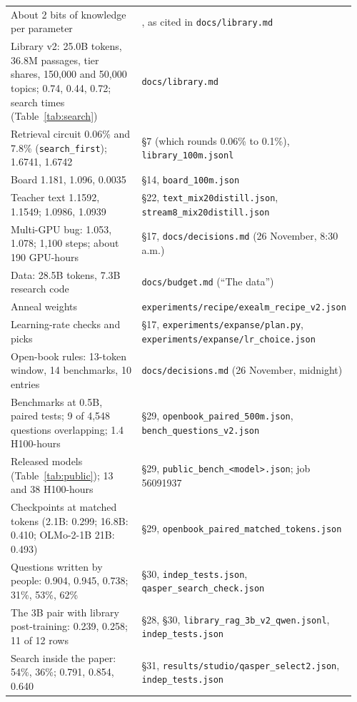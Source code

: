 \documentclass[10pt,twocolumn,letterpaper]{article}
\newcommand{\sect}[1]{\S#1}
\begin{document}
\begin{longtable}{@{}>{\raggedright\arraybackslash}p{0.56\linewidth} >{\raggedright\arraybackslash}p{0.40\linewidth}@{}}
About 2 bits of knowledge per parameter & \citet{allenzhu2024physics}, as cited in \texttt{docs/library.md} \\
Library v2: 25.0B tokens, 36.8M passages, tier shares, 150,000 and 50,000 topics; 0.74, 0.44, 0.72; search times (Table~\ref{tab:search}) & \texttt{docs/library.md} \\
Retrieval circuit 0.06\% and 7.8\% (\texttt{search\_first}); 1.6741, 1.6742 & \sect{7} (which rounds 0.06\% to 0.1\%), \texttt{library\_100m.jsonl} \\
Board 1.181, 1.096, 0.0035 & \sect{14}, \texttt{board\_100m.json} \\
Teacher text 1.1592, 1.1549; 1.0986, 1.0939 & \sect{22}, \texttt{text\_mix20distill.json}, \texttt{stream8\_mix20distill.json} \\
Multi-GPU bug: 1.053, 1.078; 1,100 steps; about 190 GPU-hours & \sect{17}, \texttt{docs/decisions.md} (26 November, 8:30 a.m.) \\
Data: 28.5B tokens, 7.3B research code & \texttt{docs/budget.md} (``The data'') \\
Anneal weights & \texttt{experiments/recipe/}\allowbreak\texttt{exealm\_recipe\_v2.json} \\
Learning-rate checks and picks & \sect{17}, \texttt{experiments/expanse/plan.py}, \texttt{experiments/expanse/lr\_choice.json} \\
Open-book rules: 13-token window, 14 benchmarks, 10 entries & \texttt{docs/decisions.md} (26 November, midnight) \\
Benchmarks at 0.5B, paired tests; 9 of 4,548 questions overlapping; 1.4 H100-hours & \sect{29}, \texttt{openbook\_paired\_500m.json}, \texttt{bench\_questions\_v2.json} \\
Released models (Table~\ref{tab:public}); 13 and 38 H100-hours & \sect{29}, \texttt{public\_bench\_<model>.json}; job 56091937 \\
Checkpoints at matched tokens (2.1B: 0.299; 16.8B: 0.410; OLMo-2-1B 21B: 0.493) & \sect{29}, \texttt{openbook\_paired\_matched\_tokens.json} \\
Questions written by people: 0.904, 0.945, 0.738; 31\%, 53\%, 62\% & \sect{30}, \texttt{indep\_tests.json}, \texttt{qasper\_search\_check.json} \\
The 3B pair with library post-training: 0.239, 0.258; 11 of 12 rows & \sect{28}, \sect{30}, \texttt{library\_rag\_3b\_v2\_qwen.jsonl}, \texttt{indep\_tests.json} \\
Search inside the paper: 54\%, 36\%; 0.791, 0.854, 0.640 & \sect{31}, \texttt{results/studio/qasper\_select2.json}, \texttt{indep\_tests.json} \\

\end{longtable}
\end{document}
